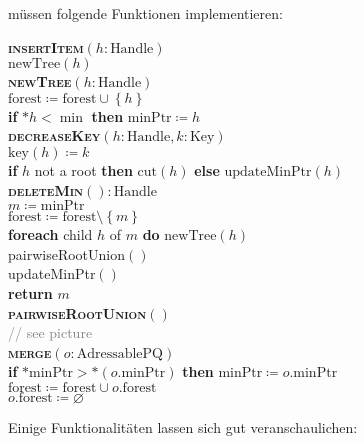  müssen folgende Funktionen implementieren:
\begin{pseudocode}
  \textbf{\textsc{insertItem}}\( (h: \text{Handle}) \) \\
  \phantom{\enskip} \( \text{newTree}(h) \) \\
  \textbf{\textsc{newTree}}\( (h: \text{Handle}) \) \\
  \phantom{\enskip} \( \text{forest} \coloneqq \text{forest} \cup \left \{ h \right \} \) \\
  \phantom{\enskip} \textbf{if} \( \ast h < \min \) \textbf{then} \( \text{minPtr} \coloneqq h \) \\
  \textbf{\textsc{decreaseKey}}\( (h : \text{Handle}, k : \text{Key}) \) \\
  \phantom{\enskip} \( \text{key}(h) \coloneqq k \) \\
  \phantom{\enskip} \textbf{if} \( h \) not a root \textbf{then} \( \text{cut}(h) \) \textbf{else} \( \text{updateMinPtr}(h) \) \\
  \textbf{\textsc{deleteMin}}\( () : \text{Handle} \) \\
  \phantom{\enskip} \( m \coloneqq \text{minPtr} \) \\
  \phantom{\enskip} \( \text{forest} \coloneqq \text{forest} \setminus \left \{ m \right \} \) \\
  \phantom{\enskip} \textbf{foreach} child \( h \) of \( m \) \textbf{do} \( \text{newTree}(h) \) \\
  \phantom{\enskip} pairwiseRootUnion\( () \) \\
  \phantom{\enskip} updateMinPtr\( () \) \\
  \phantom{\enskip} \textbf{return} \( m \) \\
  \textbf{\textsc{pairwiseRootUnion}}\( () \) \\
  \phantom{\enskip} \textcolor{gray}{// see picture} \\
  \textbf{\textsc{merge}}\( (o: \text{AdressablePQ}) \) \\
  \phantom{\enskip} \textbf{if} \( \ast\text{minPtr} > \ast(o\text{.minPtr}) \) \textbf{then} \( \text{minPtr} \coloneqq o\text{.minPtr} \) \\
  \phantom{\enskip} \( \text{forest} \coloneqq \text{forest} \cup o\text{.forest} \) \\
  \phantom{\enskip} \( o\text{.forest} \coloneqq \varnothing \)
\end{pseudocode}

Einige Funktionalitäten lassen sich gut veranschaulichen:

